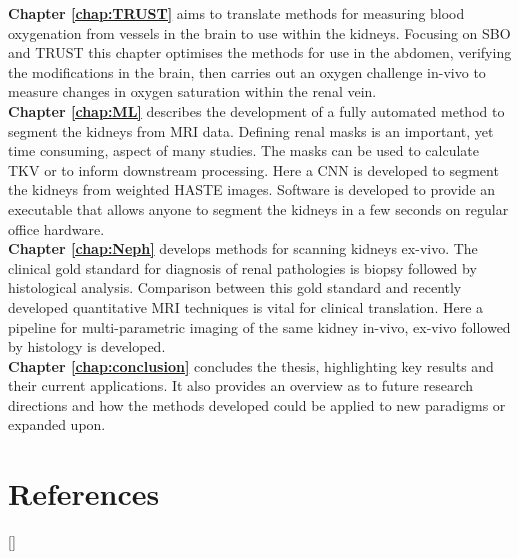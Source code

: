 \textbf{Chapter \ref{chap:TRUST}} aims to translate methods for measuring blood oxygenation from vessels in the brain to use within the kidneys. Focusing on \ac{SBO} \cite{jain_mri_2010} and \ac{TRUST} \cite{lu_quantitative_2008} this chapter optimises the methods for use in the abdomen, verifying the modifications in the brain, then carries out an oxygen challenge in-vivo to measure changes in oxygen saturation within the renal vein.\\

\textbf{Chapter \ref{chap:ML}} describes the development of a fully automated method to segment the kidneys from \ac{MRI} data. Defining renal masks is an important, yet time consuming, aspect of many studies. The masks can be used to calculate \ac{TKV} or to inform downstream processing. Here a \ac{CNN} is developed to segment the kidneys from \ttwo weighted \ac{HASTE} images. Software is developed to provide an executable that allows anyone to segment the kidneys in a few seconds on regular office hardware.\\

\textbf{Chapter \ref{chap:Neph}} develops methods for scanning kidneys ex-vivo. The clinical gold standard for diagnosis of renal pathologies is biopsy followed by histological analysis. Comparison between this gold standard and recently developed quantitative \ac{MRI} techniques is vital for clinical translation. Here a pipeline for multi-parametric imaging of the same kidney in-vivo, ex-vivo followed by histology is developed.\\

\textbf{Chapter \ref{chap:conclusion}} concludes the thesis, highlighting key results and their current applications. It also provides an overview as to future research directions and how the methods developed could be applied to new paradigms or expanded upon.\\

\newpage
\section*{References}
[\refname]{}
\printbibliography